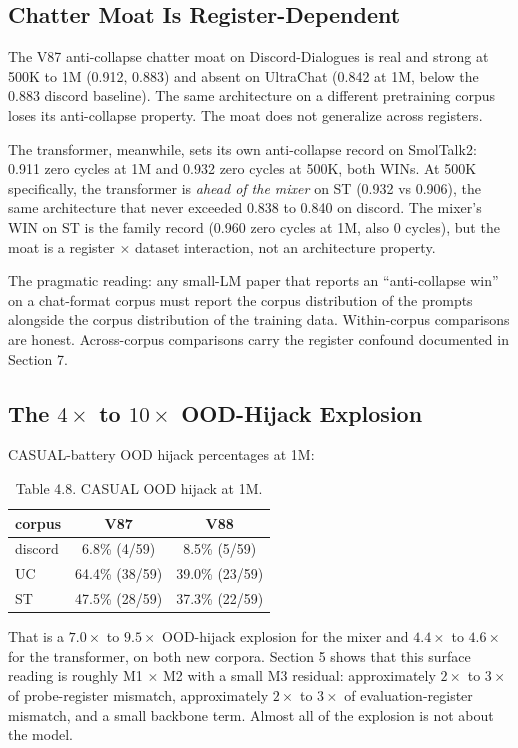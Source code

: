 \documentclass[11pt]{article}
\begin{document}
\subsection{Chatter Moat Is Register-Dependent}

The V87 anti-collapse chatter moat on Discord-Dialogues is real and strong at 500K to 1M (0.912, 0.883) and absent on UltraChat (0.842 at 1M, below the 0.883 discord baseline). The same architecture on a different pretraining corpus loses its anti-collapse property. The moat does not generalize across registers.

The transformer, meanwhile, sets its own anti-collapse record on SmolTalk2: 0.911 zero cycles at 1M and 0.932 zero cycles at 500K, both WINs. At 500K specifically, the transformer is \emph{ahead of the mixer} on ST (0.932 vs 0.906), the same architecture that never exceeded 0.838 to 0.840 on discord. The mixer's WIN on ST is the family record (0.960 zero cycles at 1M, also 0 cycles), but the moat is a register $\times$ dataset interaction, not an architecture property.

The pragmatic reading: any small-LM paper that reports an ``anti-collapse win'' on a chat-format corpus must report the corpus distribution of the prompts alongside the corpus distribution of the training data. Within-corpus comparisons are honest. Across-corpus comparisons carry the register confound documented in Section 7.

\subsection{The $4\times$ to $10\times$ OOD-Hijack Explosion}

CASUAL-battery OOD hijack percentages at 1M:

\begin{table}[!t]
\centering
\small
\caption*{Table 4.8. CASUAL OOD hijack at 1M.}
\begin{tabular}{lcc}
\toprule
corpus & V87 & V88 \\
\midrule
discord & 6.8\% (4/59) & 8.5\% (5/59) \\
UC & 64.4\% (38/59) & 39.0\% (23/59) \\
ST & 47.5\% (28/59) & 37.3\% (22/59) \\
\bottomrule
\end{tabular}
\end{table}

That is a $7.0\times$ to $9.5\times$ OOD-hijack explosion for the mixer and $4.4\times$ to $4.6\times$ for the transformer, on both new corpora. Section 5 shows that this surface reading is roughly M1 $\times$ M2 with a small M3 residual: approximately $2\times$ to $3\times$ of probe-register mismatch, approximately $2\times$ to $3\times$ of evaluation-register mismatch, and a small backbone term. Almost all of the explosion is not about the model.
\end{document}
